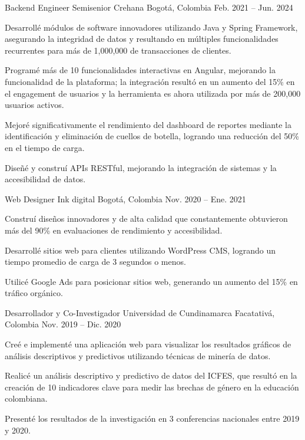 \documentclass[]{awesome-cv}
\begin{document}
\begin{cventries}
	\cventry
	{Backend Engineer Semisenior}
	{Crehana}
	{Bogotá, Colombia}
	{Feb. 2021 – Jun. 2024}
	{\begin{cvitems}
		\vspace{0.2mm}
		\item {Desarrollé módulos de software innovadores utilizando Java y Spring Framework, asegurando la integridad de datos y resultando en múltiples funcionalidades recurrentes para más de 1,000,000 de transacciones de clientes.}
		\item {Programé más de 10 funcionalidades interactivas en Angular, mejorando la funcionalidad de la plataforma; la integración resultó en un aumento del 15\% en el engagement de usuarios y la herramienta es ahora utilizada por más de 200,000 usuarios activos.}
		\item {Mejoré significativamente el rendimiento del dashboard de reportes mediante la identificación y eliminación de cuellos de botella, logrando una reducción del 50\% en el tiempo de carga.}
		\item {Diseñé y construí APIs RESTful, mejorando la integración de sistemas y la accesibilidad de datos.}
		\end{cvitems}}

	\cventry
	{Web Designer}
	{Ink digital}
	{Bogotá, Colombia}
	{Nov. 2020 – Ene. 2021}
	{\begin{cvitems}
		\vspace{0.2mm}
		\item {Construí diseños innovadores y de alta calidad que constantemente obtuvieron más del 90\% en evaluaciones de rendimiento y accesibilidad.}
		\item {Desarrollé sitios web para clientes utilizando WordPress CMS, logrando un tiempo promedio de carga de 3 segundos o menos.}
		\item {Utilicé Google Ads para posicionar sitios web, generando un aumento del 15\% en tráfico orgánico.}
		\end{cvitems}}

	\cventry
	{Desarrollador y Co-Investigador}
	{Universidad de Cundinamarca}
	{Facatativá, Colombia}
	{Nov. 2019 – Dic. 2020}
	{\begin{cvitems}
		\vspace{0.2mm}
		\item {Creé e implementé una aplicación web para visualizar los resultados gráficos de análisis descriptivos y predictivos utilizando técnicas de minería de datos.}
		\item {Realicé un análisis descriptivo y predictivo de datos del ICFES, que resultó en la creación de 10 indicadores clave para medir las brechas de género en la educación colombiana.}
		\item {Presenté los resultados de la investigación en 3 conferencias nacionales entre 2019 y 2020.}
		\end{cvitems}}
\end{cventries}
\end{document}
